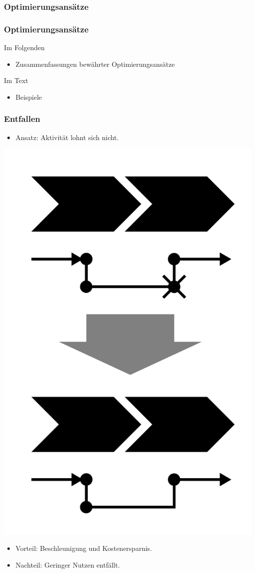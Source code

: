 \documentclass[xcolor=dvipsnames]{beamer}
\begin{document}
 \subsubsection{Optimierungsansätze}
 \begin{frame}
  \frametitle{Optimierungsansätze}
  Im Folgenden
  \begin{itemize}
    \item Zusammenfassungen bewährter Optimierungsansätze
  \end{itemize}
  Im Text
  \begin{itemize}
    \item Beispiele
  \end{itemize}
 \end{frame}

 \begin{frame}
  \frametitle{Entfallen}
   \begin{itemize}
    \item Ansatz: Aktivität lohnt sich nicht.
   \end{itemize}
  \centerline{\includegraphics[scale=2.5]{4_6_1.png}}
  \begin{itemize}
    \item Vorteil: Beschleunigung und Kostenersparnis.
    \item Nachteil: Geringer Nutzen entfällt.
  \end{itemize}
 \end{frame}
\end{document}

